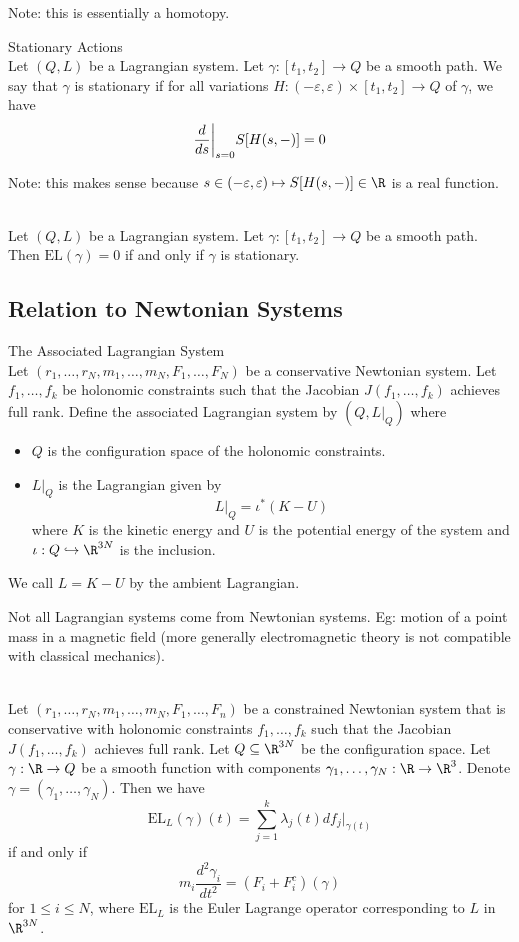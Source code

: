 \documentclass[a4paper]{article}
\begin{document}
Note: this is essentially a homotopy. 

\begin{defn}{Stationary Actions}{}\\
Let $(Q,L)$ be a Lagrangian system. Let $\gamma:[t_1,t_2]\to Q$ be a smooth path. We say that $\gamma$ is stationary if for all variations $H:(-\varepsilon,\varepsilon)\times[t_1,t_2]\to Q$ of $\gamma$, we have $$\frac{d}{ds}\bigg{|}_{s=0}S[H(s,-)]=0$$
\end{defn}

Note: this makes sense because $s\in(-\varepsilon,\varepsilon)\mapsto S[H(s,-)]\in\R$ is a real function. 

\begin{thm}{}{}\\
Let $(Q,L)$ be a Lagrangian system. Let $\gamma:[t_1,t_2]\to Q$ be a smooth path. Then $\text{EL}(\gamma)=0$ if and only if $\gamma$ is stationary. 
\end{thm}

\subsection{Relation to Newtonian Systems}
\begin{defn}{The Associated Lagrangian System}{}\\
Let $(r_1,\dots,r_N,m_1,\dots,m_N,F_1,\dots,F_N)$ be a conservative Newtonian system. Let $f_1,\dots,f_k$ be holonomic constraints such that the Jacobian $J(f_1,\dots,f_k)$ achieves full rank. Define the associated Lagrangian system by $(Q,L|_Q)$ where 
\begin{itemize}
\item $Q$ is the configuration space of the holonomic constraints. 
\item $L|_Q$ is the Lagrangian given by $$L|_Q=\iota^\ast(K-U)$$ where $K$ is the kinetic energy and $U$ is the potential energy of the system and $\iota:Q\hookrightarrow\R^{3N}$ is the inclusion. 
\end{itemize}
We call $L=K-U$ by the ambient Lagrangian. 
\end{defn}

Not all Lagrangian systems come from Newtonian systems. Eg: motion of a point mass in a magnetic field (more generally electromagnetic theory is not compatible with classical mechanics). 

\begin{thm}{}{}\\
Let $(r_1,\dots,r_N,m_1,\dots,m_N,F_1,\dots,F_n)$ be a constrained Newtonian system that is conservative with holonomic constraints $f_1,\dots,f_k$ such that the Jacobian $J(f_1,\dots,f_k)$ achieves full rank. Let $Q\subseteq\R^{3N}$ be the configuration space. Let $\gamma:\R\to Q$ be a smooth function with components $\gamma_1,\dots,\gamma_N:\R\to\R^3$. Denote $\gamma=(\gamma_1,\dots,\gamma_N)$. Then we have $$\text{EL}_L(\gamma)(t)=\sum_{j=1}^k\lambda_j(t)df_j|_{\gamma(t)}$$ if and only if $$m_i\frac{d^2\gamma_i}{dt^2}=(F_i+F_i^c)(\gamma)$$ for $1\leq i\leq N$, where $\text{EL}_L$ is the Euler Lagrange operator corresponding to $L$ in $\R^{3N}$. 
\end{thm}
\end{document}
